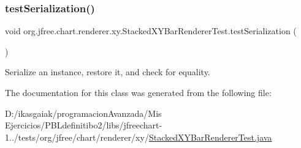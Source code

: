 \subsubsection{\texorpdfstring{test\+Serialization()}{testSerialization()}}
{\footnotesize\ttfamily void org.\+jfree.\+chart.\+renderer.\+xy.\+Stacked\+X\+Y\+Bar\+Renderer\+Test.\+test\+Serialization (\begin{DoxyParamCaption}{ }\end{DoxyParamCaption})}

Serialize an instance, restore it, and check for equality. 

The documentation for this class was generated from the following file\+:\begin{DoxyCompactItemize}
\item 
D\+:/ikasgaiak/programacion\+Avanzada/\+Mis Ejercicios/\+P\+B\+Ldefinitibo2/libs/jfreechart-\/1../tests/org/jfree/chart/renderer/xy/\mbox{\hyperlink{_stacked_x_y_bar_renderer_test_8java}{Stacked\+X\+Y\+Bar\+Renderer\+Test.\+java}}\end{DoxyCompactItemize}
